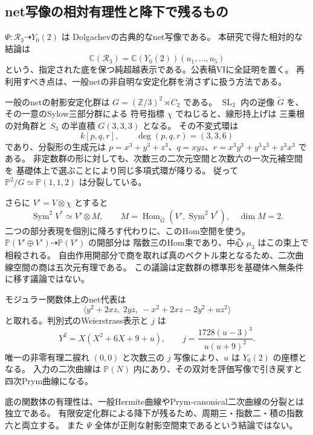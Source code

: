 \subsection{net写像の相対有理性と降下で残るもの}
\label{subsec:notes-relative-rational-v28}

$\Psi:\mathcal R_3\dashrightarrow Y_0(2)$ は
Dolgachev\cite[Remark~4.1]{DolgachevRationality2008}の古典的なnet写像である。
本研究で得た相対的な結論は
\[
 \mathbb C(\mathcal R_3)=\mathbb C(Y_0(2))(u_1,\ldots,u_5)
\]
という、指定された底を保つ純超越表示である。公表稿VIに全証明を置く。
再利用すべき点は、一般netの非自明な安定化群を消さずに扱う方法である。

一般のnetの射影安定化群は
$G=(\mathbb Z/3)^2\rtimes C_2$ である。
$\operatorname{SL}_3$ 内の逆像 $\widetilde G$ を、その一意のSylow三部分群による
符号指標 $\chi$ でねじると、線形持上げは
三乗根の対角群と $S_3$ の半直積 $G(3,3,3)$ となる。
その不変式環は
\[
 k[p,q,r],\qquad \deg(p,q,r)=(3,3,6)
\]
であり、分裂形の生成元は
$p=x^3+y^3+z^3$、$q=xyz$、$r=x^3y^3+y^3z^3+z^3x^3$ である。
非定数群の形に対しても、次数三の二次元空間と次数六の一次元補空間を
基礎体上で選ぶことにより同じ多項式環が降りる。
従って $\mathbb P^2/G\simeq\mathbb P(1,1,2)$ は分裂している。

さらに $V'=V\otimes\chi$ とすると
\[
 \operatorname{Sym}^2V^*\simeq V'\otimes M,\qquad
 M=\operatorname{Hom}_{\widetilde G}(V',\operatorname{Sym}^2V^*),\quad\dim M=2.
\]
二つの部分表現を個別に降ろす代わりに、このHom空間を使う。
$\mathbb P(V'\oplus V')\dashrightarrow\mathbb P(V')$ の開部分は
階数三のHom束であり、中心 $\mu_3$ はこの束上で相殺される。
自由作用開部分で商を取れば真のベクトル束となるため、二次曲線空間の商は五次元有理である。
この議論は定数群の標準形を基礎体へ無条件に移す議論ではない。

モジュラー関数体上のnet代表は
\[
 \langle y^2+2xz,\ 2yz,\ -x^2+2xz-2y^2+uz^2\rangle
\]
と取れる。判別式のWeierstrass表示と $j$ は
\[
 Y^2=X(X^2+6X+9+u),\qquad
 j=\frac{1728(u-3)^3}{u(u+9)^2}.
\]
唯一の非零有理二捩れ $(0,0)$ と次数三の $j$ 写像により、$u$ は $Y_0(2)$ の座標となる。
入力の二次曲線は $\mathbb P(N)$ 内にあり、その双対を評価写像で引き戻すと四次Prym曲線になる。

底の関数体の有理性は、一般Hermite曲線やPrym-canonical二次曲線の分裂とは独立である。
有限安定化群による降下が残るため、周期三・指数二・積の指数六と両立する。
また $\Psi$ 全体が正則な射影空間束であるという結論ではない。
